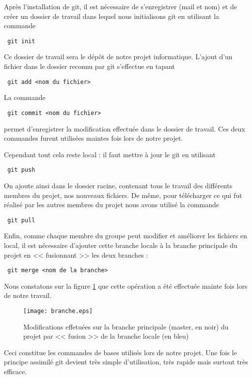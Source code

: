 Apr\`es l'installation de git, il est n\'ecessaire de s'enregistrer (mail et nom) et de cr\'eer un dossier de travail dans lequel nous 
initialisons git en utilisant la commande
\begin{verbatim} git init \end{verbatim}
Ce dossier de travail sera le d\'ep\^ot de notre projet informatique. L'ajout d'un fichier dans le dossier reconnu par git s'effectue en tapant
\begin{verbatim} git add <nom du fichier> \end{verbatim}
La commande
\begin{verbatim} git commit <nom du fichier> \end{verbatim} permet d'enregistrer la modification effectu\'ee dans le dossier de travail.
Ces deux commandes furent utilis\'ees maintes fois lors de notre projet. 

Cependant tout cela reste local : il faut mettre \`a jour le git en utilisant
\begin{verbatim} git push \end{verbatim}
On ajoute ainsi dans le dossier racine, contenant tous le travail des diff\'erents membres du projet, nos nouveaux fichiers. 
De m\^eme, pour t\'el\'echarger ce qui fut r\'ealis\'e par les autres membres du projet nous avons utilis\'e la commande
\begin{verbatim} git pull \end{verbatim}

Enfin, comme chaque membre du groupe peut modifier et am\'eliorer les fichiers en local, il est n\'ecessaire d'ajouter cette branche locale \`a la branche
principale du projet en << fusionnant >> les deux branches :
\begin{verbatim} git merge <nom de la branche>\end{verbatim}
Nous constatons sur la figure \ref{fig:branche} que cette op\'eration a \'et\'e effectu\'ee mainte fois lors de notre travail.

\begin{figure}[h]
\begin{center}
\texttt{[image: branche.eps]}
\end{center}
\caption{Modifications effetu\'ees sur la branche principale (master, en noir) du projet par << fusion >> de la branche locale (en bleu)}
\label{fig:branche}
\end{figure}

Ceci constitue les commandes de bases utilis\'es lors de notre projet. Une fois le principe assimil\'e git devient tr\`es simple d'utilisation,
 tr\`es rapide mais surtout tr\`es efficace.

